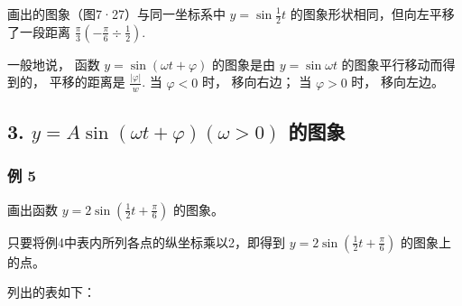 画出的图象（图7·27）与同一坐标系中 \(y = \sin \frac{1}{2} t\)
的图象形状相同，但向左平移了一段距离
\(\frac{\pi}{3}\left(-\frac{\pi}{6} \div \frac{1}{2}\right)\).

一般地说， 函数 \(y = \sin (\omega t + \varphi)\) 的图象是由
\(y = \sin \omega t\) 的图象平行移动而得到的， 平移的距离是
\(\frac{|\varphi|}{w}\). 当 \(\varphi < 0\) 时， 移向右边； 当
\(\varphi > 0\) 时， 移向左边。

\subsection{\texorpdfstring{3. \(y = A\sin (\omega t + \varphi)(\omega >0)\) 的图象}{3. y = A\textbackslash sin (\textbackslash omega t + \textbackslash varphi)(\textbackslash omega \textgreater0) 的图象}}\label{y-asin-omega-t-varphiomega-0-ux7684ux56feux8c61}

\subsubsection{例 5}

画出函数 \(y = 2\sin \left(\frac{1}{2} t + \frac{\pi}{6}\right)\)
的图象。

 只要将例4中表内所列各点的纵坐标乘以2，即得到
\(y=2\sin\left(\frac{1}{2}t+\frac{\pi}{6}\right)\) 的图象上的点。

列出的表如下：

